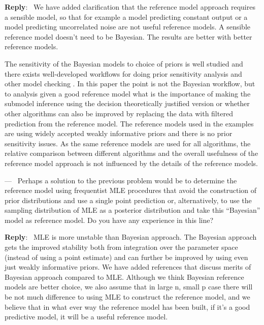 \documentclass[11pt]{article}
\newcounter{reviewer}
\newcounter{point}[reviewer]
\renewcommand{\thepoint}{P\,\thereviewer.\arabic{point}}
\newenvironment{point}
   {\refstepcounter{point} \bigskip \noindent {\textbf{Reviewer~Point~\thepoint} } ---\ }
   {\par }
\newenvironment{reply}
   {\medskip \noindent \begin{sf}\textbf{Reply}:\  }
   {\medskip \end{sf}}
\newcommand{\todo}{\subsection*{\textcolor{red}{To do (comment out when done)}:}}
\begin{document}
\begin{reply}
We have added clarification that the reference model approach requires a sensible model, so that for example a model predicting constant output or a model predicting uncorrelated noise are not useful reference models.
A sensible reference model doesn't need to be Bayesian. The results are better with better reference models. 

The sensitivity of the Bayesian models to choice of priors is well studied and there exists well-developed workflows for doing prior sensitivity analysis and other model checking \citep[see, e.g.][]{gelman2020bayesian}. In this paper the point is not the Bayesian workflow, but to analysis given a good reference model what is the importance of making the submodel inference using the decision theoretically justified version or whether other algorithms can also be improved by replacing the data with filtered prediction from the reference model. The reference models used in the examples are using widely accepted weakly informative priors and there is no prior sensitivity issues. As the same reference models are used for all algorithms, the relative comparison between different algorithms and the overall usefulness of the reference model approach is not influenced by the details of the reference models.
\end{reply}



\begin{point}
Perhaps a solution to the previous problem would be to determine the reference model using frequentist MLE procedures that avoid the construction of prior distributions and use a single point prediction or, alternatively, to use the sampling distribution of MLE as a posterior distribution and take this “Bayesian” model as reference model. Do you have any experience in this line?
\end{point}

\begin{reply}
MLE is more unstable than Bayesian approach. The Bayesian approach gets the improved stability both from integration over the parameter space (instead of using a point estimate) and can further be improved by using even just weakly informative priors. We have added references that discuss merits of Bayesian approach compared to MLE. Although we think Bayesian reference models are better choice, we also assume that in large n, small p case there will be not much difference to using MLE to construct the reference model, and we believe that in what ever way the reference model has been built, if it's a good predictive model, it will be a useful reference model.
\end{reply}
\end{document}
